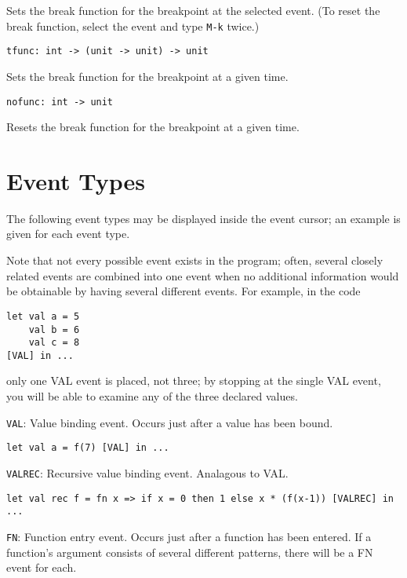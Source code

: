 Sets the break function for the breakpoint at the selected event.  (To
reset the break function, select the event and type \verb'M-k' twice.) 

\begin{verbatim}
tfunc: int -> (unit -> unit) -> unit
\end{verbatim}

Sets the break function for the breakpoint at a given time.

\begin{verbatim}
nofunc: int -> unit
\end{verbatim}

Resets the break function for the breakpoint at a given time.

\section{Event Types}
The following event types may be displayed inside the event cursor; an
example is given for each event type.

Note that not every possible event exists in the program; often,
several closely related events are combined into one event when no
additional information would be obtainable by having several different
events.  For example, in the code

\begin{verbatim}
let val a = 5
    val b = 6
    val c = 8
[VAL] in ...
\end{verbatim}

only one VAL event is placed, not three; by stopping at the single VAL
event, you will be able to examine any of the three declared values.

\vspace{0.25in}
\verb'VAL': Value binding event.  Occurs just after a value has been bound.

\begin{verbatim}
let val a = f(7) [VAL] in ...
\end{verbatim}

\verb'VALREC': Recursive value binding event.  Analagous to VAL.

\begin{verbatim}
let val rec f = fn x => if x = 0 then 1 else x * (f(x-1)) [VALREC] in ...
\end{verbatim}

\verb'FN': Function entry event.  Occurs just after a function has been
entered.  If a function's argument consists of several different
patterns, there will be a FN event for each.

